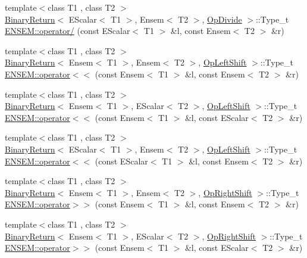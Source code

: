\begin{DoxyCompactItemize}
\item 
{\footnotesize template$<$class T1 , class T2 $>$ }\\\mbox{\hyperlink{structBinaryReturn}{Binary\+Return}}$<$ E\+Scalar$<$ T1 $>$, Ensem$<$ T2 $>$, \mbox{\hyperlink{structOpDivide}{Op\+Divide}} $>$\+::Type\+\_\+t \mbox{\hyperlink{group__eensem_ga6a5de93e7f9569ae6390f831343a0430}{E\+N\+S\+E\+M\+::operator/}} (const E\+Scalar$<$ T1 $>$ \&l, const Ensem$<$ T2 $>$ \&r)
\item 
{\footnotesize template$<$class T1 , class T2 $>$ }\\\mbox{\hyperlink{structBinaryReturn}{Binary\+Return}}$<$ Ensem$<$ T1 $>$, Ensem$<$ T2 $>$, \mbox{\hyperlink{structOpLeftShift}{Op\+Left\+Shift}} $>$\+::Type\+\_\+t \mbox{\hyperlink{group__eensem_ga822a79ca0b7e9ffdd3c9fbfaad909967}{E\+N\+S\+E\+M\+::operator$<$$<$}} (const Ensem$<$ T1 $>$ \&l, const Ensem$<$ T2 $>$ \&r)
\item 
{\footnotesize template$<$class T1 , class T2 $>$ }\\\mbox{\hyperlink{structBinaryReturn}{Binary\+Return}}$<$ Ensem$<$ T1 $>$, E\+Scalar$<$ T2 $>$, \mbox{\hyperlink{structOpLeftShift}{Op\+Left\+Shift}} $>$\+::Type\+\_\+t \mbox{\hyperlink{group__eensem_ga6651d0e3a61fd80d621e17a1ae4496af}{E\+N\+S\+E\+M\+::operator$<$$<$}} (const Ensem$<$ T1 $>$ \&l, const E\+Scalar$<$ T2 $>$ \&r)
\item 
{\footnotesize template$<$class T1 , class T2 $>$ }\\\mbox{\hyperlink{structBinaryReturn}{Binary\+Return}}$<$ E\+Scalar$<$ T1 $>$, Ensem$<$ T2 $>$, \mbox{\hyperlink{structOpLeftShift}{Op\+Left\+Shift}} $>$\+::Type\+\_\+t \mbox{\hyperlink{group__eensem_ga8276aea8565989d936393895688a0a95}{E\+N\+S\+E\+M\+::operator$<$$<$}} (const E\+Scalar$<$ T1 $>$ \&l, const Ensem$<$ T2 $>$ \&r)
\item 
{\footnotesize template$<$class T1 , class T2 $>$ }\\\mbox{\hyperlink{structBinaryReturn}{Binary\+Return}}$<$ Ensem$<$ T1 $>$, Ensem$<$ T2 $>$, \mbox{\hyperlink{structOpRightShift}{Op\+Right\+Shift}} $>$\+::Type\+\_\+t \mbox{\hyperlink{group__eensem_ga8b0f105a14d5692cffad3db6bae659fb}{E\+N\+S\+E\+M\+::operator$>$$>$}} (const Ensem$<$ T1 $>$ \&l, const Ensem$<$ T2 $>$ \&r)
\item 
{\footnotesize template$<$class T1 , class T2 $>$ }\\\mbox{\hyperlink{structBinaryReturn}{Binary\+Return}}$<$ Ensem$<$ T1 $>$, E\+Scalar$<$ T2 $>$, \mbox{\hyperlink{structOpRightShift}{Op\+Right\+Shift}} $>$\+::Type\+\_\+t \mbox{\hyperlink{group__eensem_ga1741fb098dc44e2f5fcd2bcabeafa0ed}{E\+N\+S\+E\+M\+::operator$>$$>$}} (const Ensem$<$ T1 $>$ \&l, const E\+Scalar$<$ T2 $>$ \&r)

\end{DoxyCompactItemize}
